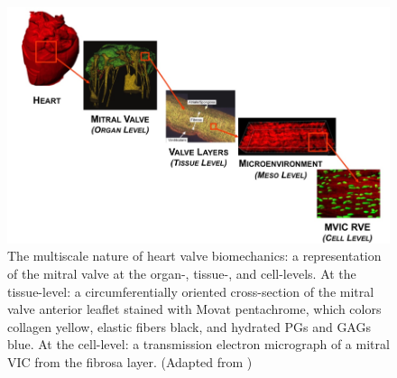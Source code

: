 \begin{figure}
\centering
\includegraphics[width=\textwidth]{Images/chapter1/multiscalevalve.png}
\caption{The multiscale nature of heart valve biomechanics: a representation of the mitral valve at the organ-, tissue-, and cell-levels. At the tissue-level: a circumferentially oriented cross-section of the mitral valve anterior leaflet stained with Movat pentachrome, which colors collagen yellow, elastic fibers black, and hydrated PGs and GAGs blue. At the cell-level: a transmission electron micrograph of a mitral VIC from the fibrosa layer. (Adapted from \cite{ayoub_heart_2016})}
\label{fig:multiscalevalve}
\end{figure}


